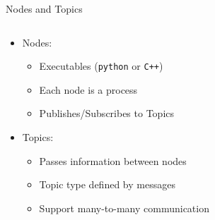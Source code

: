 \documentclass[aspectratio=43]{beamer}
\begin{document}
\begin{frame}{Nodes and Topics}
	\begin{columns}[c]
		\begin{column}{0.5\textwidth}
			\begin{itemize}
				\item Nodes:
					\begin{itemize}
					\item Executables (\texttt{python} or \texttt{C++})
					\item Each node is a process
					\item Publishes/Subscribes to Topics
					\end{itemize}
				\item Topics:
					\begin{itemize}
					\item Passes information between nodes
					\item Topic type defined by messages
					\item Support many-to-many communication
					\end{itemize}
			\end{itemize}
		\end{column}
		\begin{column}{0.5\textwidth}
		\end{column}
	\end{columns}
\end{frame}
\end{document}
